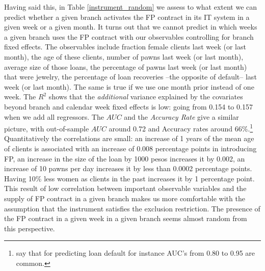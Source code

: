 Having said this, in Table \ref{instrument_random} we assess to what extent we can predict whether a given branch activates the FP contract in its IT system in a given week or a given month. It turns out that we cannot predict in which weeks a given branch uses the FP contract with our observables controlling for branch fixed effects. The observables include fraction female clients last week (or last month), the age of these clients, number of pawns last week (or last month), average size of those loans, the percentage of pawns last week (or last month) that were jewelry, the percentage of loan recoveries --the opposite of default-- last week (or last month). The same is true if we use one month prior instead of one week. The $R^2$ shows that the \textit{additional} variance explained by the covariates beyond branch and calendar week fixed effects is low: going from 0.154 to 0.157 when we add all regressors. The $AUC$ and the \textit{Accuracy Rate} give a similar picture, with out-of-sample $AUC$ around 0.72 and Accuracy rates around 66\%.\footnote{\cite{Finanzia} say that for predicting loan default for instance AUC's from 0.80 to 0.95 are common.} \\ %

Quantitatively the correlations are small: an increase of 1 years of the mean age of clients is associated with an increase of 0.008 percentage points in introducing FP, an increase in the size of the loan by 1000 pesos increases it by 0.002, an increase of 10 pawns per day increases it by less than 0.0002 percentage points. Having 10\% less women as clients in the past increases it by 1 percentage point. This result of low correlation between important observable variables and the supply of FP contract in a given branch makes us more comfortable with the assumption that the instrument satisfies the exclusion restriction. The presence of the FP contract in a given week in a given branch seems almost random from this perspective.

